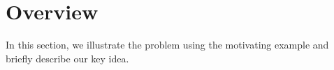 \section{Overview}
\label{sec:overview}
In this section, we illustrate the problem using the motivating example and briefly describe our key idea.


